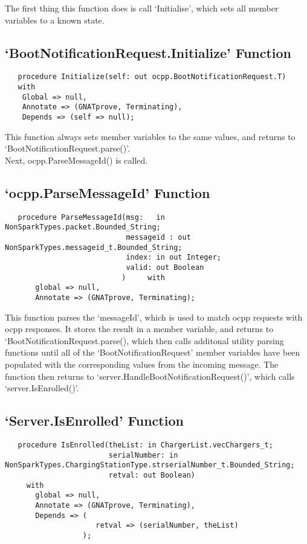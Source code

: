 \documentclass[12pt,openany,a4paper]{book}
\begin{document}
The first thing this function does is call `Initialise', which sets all member variables to a known state.


\subsection{`BootNotificationRequest.Initialize' Function}
\begin{verbatim}
   procedure Initialize(self: out ocpp.BootNotificationRequest.T)
   with
    Global => null,
    Annotate => (GNATprove, Terminating),
    Depends => (self => null);
\end{verbatim}

This function always sets member variables to the same values, and returns to `BootNotificationRequest.parse()'.\\

Next, ocpp.ParseMessageId() is called.
\subsection{`ocpp.ParseMessageId' Function}
\begin{verbatim}
   procedure ParseMessageId(msg:   in  NonSparkTypes.packet.Bounded_String;
                            messageid : out NonSparkTypes.messageid_t.Bounded_String;
                            index: in out Integer;
                            valid: out Boolean
                           )     with
       global => null,
       Annotate => (GNATprove, Terminating);

\end{verbatim}
This function parses the `messageId', which is used to match ocpp requests with ocpp responses. It stores the result in a member variable, and returns to `BootNotificationRequest.parse(), which then calls additonal utility parsing functions until all of the `BootNotificationRequest' member variables have been populated with the corresponding values from the incoming message. The function then returns to `server.HandleBootNotificationRequest()', which calls `server.IsEnrolled()'.\\



\subsection{`Server.IsEnrolled' Function}
\begin{verbatim}
   procedure IsEnrolled(theList: in ChargerList.vecChargers_t;
                        serialNumber: in NonSparkTypes.ChargingStationType.strserialNumber_t.Bounded_String;
                        retval: out Boolean)
     with
       global => null,
       Annotate => (GNATprove, Terminating),
       Depends => (
                     retval => (serialNumber, theList)
                  );

\end{verbatim}
\end{document}
